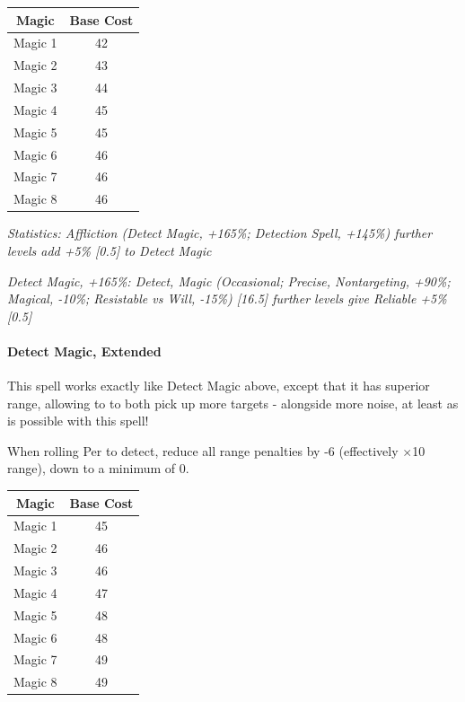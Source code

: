 \begin{multicols}{3}
	\begin{center}
		\begin{tabular}{|c|c|}
			\hline
			Magic & Base Cost \\
			\hline
			\hline
			Magic 1 & 42 \\
			Magic 2 & 43 \\
			Magic 3 & 44 \\
			Magic 4 & 45 \\
			Magic 5 & 45 \\
			Magic 6 & 46 \\
			Magic 7 & 46 \\
			Magic 8 & 46 \\
			\hline
		\end{tabular}
	\end{center} 
	
	\textcolor{OliveGreen}{\textit{ Statistics: Affliction (Detect Magic, +165\%; Detection Spell, +145\%) further levels add +5\% [0.5] to Detect Magic}}
	
	\textcolor{OliveGreen}{\textit{Detect Magic, +165\%: Detect, Magic (Occasional; Precise, Nontargeting, +90\%; Magical, -10\%; Resistable vs Will, -15\%) [16.5] further levels give Reliable +5\% [0.5]}}
	
	\paragraph{Detect Magic, Extended}
	
	This spell works exactly like Detect Magic above, except that it has superior range, allowing to to both pick up more targets - alongside more noise, at least as is possible with this spell!
	
	When rolling Per to detect, reduce all range penalties by -6 (effectively $\times$10 range), down to a minimum of 0.
	
	\begin{center}
		\begin{tabular}{|c|c|}
			\hline
			Magic & Base Cost \\
			\hline
			\hline
			Magic 1 & 45 \\
			Magic 2 & 46 \\
			Magic 3 & 46 \\
			Magic 4 & 47 \\
			Magic 5 & 48 \\
			Magic 6 & 48 \\
			Magic 7 & 49 \\
			Magic 8 & 49 \\
			\hline
		\end{tabular}
	\end{center} 
	

\end{multicols}
